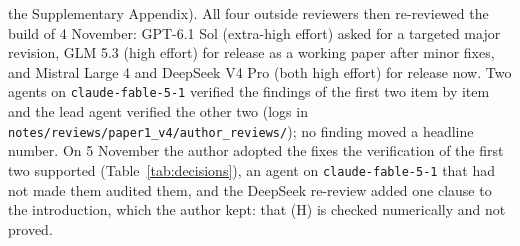 the Supplementary Appendix). All four outside reviewers then re-reviewed the build of 4 November: GPT-6.1 Sol (extra-high effort) asked for a targeted major revision, GLM 5.3 (high effort) for release as a working paper after minor fixes, and Mistral Large 4 and DeepSeek V4 Pro (both high effort) for release now. Two agents on \texttt{claude-fable-5-1} verified the findings of the first two item by item and the lead agent verified the other two (logs in \texttt{notes/reviews/paper1\_v4/author\_reviews/}); no finding moved a headline number. On 5 November the author adopted the fixes the verification of the first two supported (Table~\ref{tab:decisions}), an agent on \texttt{claude-fable-5-1} that had not made them audited them, and the DeepSeek re-review added one clause to the introduction, which the author kept: that (H) is checked numerically and not proved.

